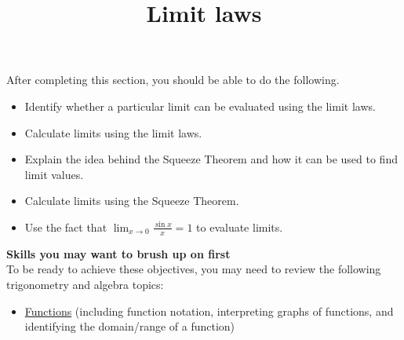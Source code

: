 \documentclass{ximera}
\title{Limit laws}
\begin{document}
\begin{abstract}
\end{abstract}

\maketitle

\begin{sectionOutcomes}
After completing this section, you should be able to do the following.

\begin{itemize}
\item Identify whether a particular limit can be evaluated using the limit laws.
\item Calculate limits using the limit laws. 
\item Explain the idea behind the Squeeze Theorem and how it can be used to find limit values.
\item Calculate limits using the Squeeze Theorem.
\item Use the fact that $\lim_{x \to 0} \frac{\sin x}{x} = 1$ to evaluate limits.
\end{itemize}
\end{sectionOutcomes}

\phantom{text}%


\textbf{Skills you may want to brush up on first} \\ To be ready to achieve these objectives, you may need to review the following trigonometry and algebra topics: 
\begin{itemize}
    \item \href{https://ximera.osu.edu/math160fa17/m160prerequisites/understandingFunctions/titlePage}{Functions} (including function notation, interpreting graphs of functions, and identifying the domain/range of a function)
\end{itemize}
\end{document}
